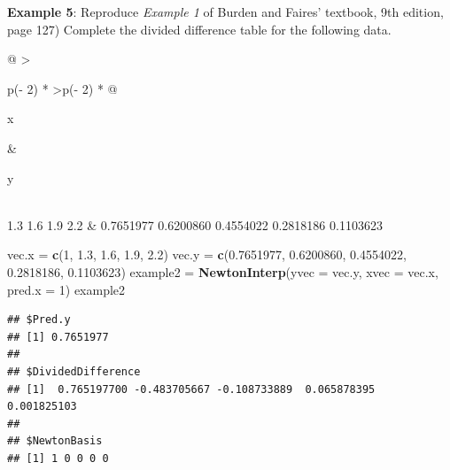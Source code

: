 \documentclass[
]{book}
\newenvironment{Shaded}{\begin{snugshade}}{\end{snugshade}}
\newcommand{\AttributeTok}[1]{\textcolor[rgb]{0.13,0.29,0.53}{#1}}
\newcommand{\DecValTok}[1]{\textcolor[rgb]{0.00,0.00,0.81}{#1}}
\newcommand{\FloatTok}[1]{\textcolor[rgb]{0.00,0.00,0.81}{#1}}
\newcommand{\FunctionTok}[1]{\textcolor[rgb]{0.13,0.29,0.53}{\textbf{#1}}}
\newcommand{\NormalTok}[1]{#1}
\newcommand{\OtherTok}[1]{\textcolor[rgb]{0.56,0.35,0.01}{#1}}
\newcommand{\SpecialCharTok}[1]{\textcolor[rgb]{0.81,0.36,0.00}{\textbf{#1}}}
\begin{document}
\textbf{Example 5}: Reproduce \emph{Example 1} of Burden and Faires' textbook, 9th edition, page 127) Complete the divided difference table for the following data.

\begin{longtable}[]{@{}
  >{\raggedright\arraybackslash}p{(\columnwidth - 2\tabcolsep) * }
  >{\centering\arraybackslash}p{(\columnwidth - 2\tabcolsep) * }@{}}
\toprule\noalign{}
\begin{minipage}[b]{\linewidth}\raggedright
x
\end{minipage} & \begin{minipage}[b]{\linewidth}\centering
y
\end{minipage} \\
\midrule\noalign{}
\endhead
\bottomrule\noalign{}
1.3
1.6
1.9
2.2 & 0.7651977
0.6200860
0.4554022
0.2818186
0.1103623 \\
\end{longtable}

\begin{Shaded}
\begin{Highlighting}[]
\NormalTok{vec.x }\OtherTok{=} \FunctionTok{c}\NormalTok{(}\DecValTok{1}\NormalTok{, }\FloatTok{1.3}\NormalTok{, }\FloatTok{1.6}\NormalTok{, }\FloatTok{1.9}\NormalTok{, }\FloatTok{2.2}\NormalTok{)          }
\NormalTok{vec.y }\OtherTok{=} \FunctionTok{c}\NormalTok{(}\FloatTok{0.7651977}\NormalTok{, }\FloatTok{0.6200860}\NormalTok{, }\FloatTok{0.4554022}\NormalTok{, }\FloatTok{0.2818186}\NormalTok{, }\FloatTok{0.1103623}\NormalTok{)}
\NormalTok{example2 }\OtherTok{=} \FunctionTok{NewtonInterp}\NormalTok{(}\AttributeTok{yvec =}\NormalTok{ vec.y, }\AttributeTok{xvec =}\NormalTok{ vec.x, }\AttributeTok{pred.x =} \DecValTok{1}\NormalTok{)}
\NormalTok{example2}
\end{Highlighting}
\end{Shaded}

\begin{verbatim}
## $Pred.y
## [1] 0.7651977
## 
## $DividedDifference
## [1]  0.765197700 -0.483705667 -0.108733889  0.065878395  0.001825103
## 
## $NewtonBasis
## [1] 1 0 0 0 0
\end{verbatim}

\begin{Shaded}
\end{Shaded}
\end{document}
